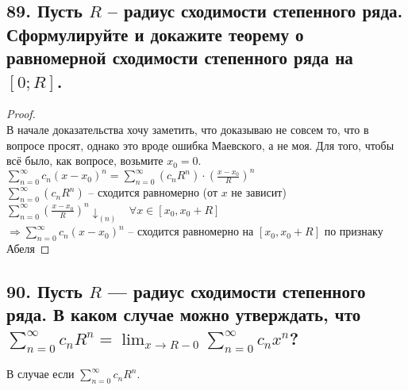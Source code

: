 \documentclass[a4paper, fleqn]{article}
\begin{document}
    \subsection*{89. Пусть $\displaystyle R$ -- радиус сходимости степенного
    ряда. Сформулируйте и докажите теорему о равномерной сходимости степенного ряда
    на $\displaystyle [0; R]$.}
    \begin{proof} \ \\
        В начале доказательства хочу заметить,
         что доказываю не совсем то, что в вопросе просят, однако это вроде 
         ошибка Маевского, а не моя. Для того, чтобы всё было, как вопросе, возьмите
         $\displaystyle x_0 = 0$. \\ 
         $\displaystyle \sum_{n = 0}^{\infty}c_n(x - x_0)^n =
         \sum_{n = 0}^{\infty}(c_nR^n)\cdot \left(\frac{x - x_0}{R}\right)^n$\\
         $\displaystyle \sum_{n = 0}^{\infty}(c_nR^n)$ -- сходится равномерно 
         (от $\displaystyle x$ не зависит) \\ 
         $\displaystyle \sum_{n = 0}^{\infty}\left(\frac{x - x_0}{R}\right)^n 
         \downarrow_{(n)}$ \ $\displaystyle \forall x \in [x_0, x_0 + R]$ \\ 
         $\displaystyle \Rightarrow \sum_{n = 0}^{\infty}c_n(x - x_0)^n$ -- сходится
         равномерно на $\displaystyle
         [x_0, x_0 + R]$
         по признаку Абеля 
    \end{proof}
    
    \subsection*{90. Пусть $R$ — радиус сходимости степенного ряда. В каком случае можно утверждать, что 
    $\displaystyle \sum_{n=0}^{\infty} c_n R^n = \lim_{x\to R - 0} \sum_{n = 0}^{\infty} c_n x^n$?}
    
    В случае если $\displaystyle \sum_{n=0}^{\infty} c_n R^n$.
\end{document}
